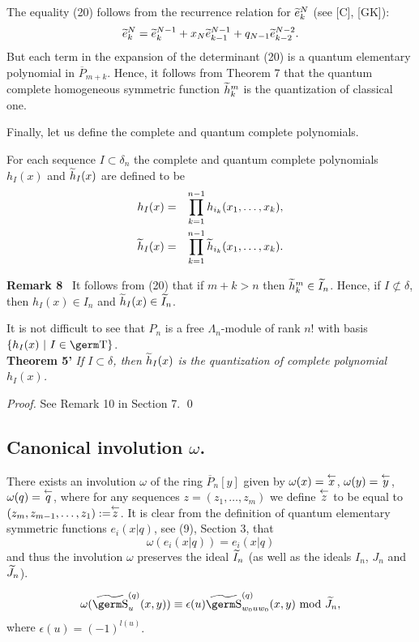 {{The equality (20) follows from the recurrence relation for 
$\widetilde{e}_k^N$ (see [C], [GK]): 
\[ \widetilde{e}_k^N = \widetilde{e}_k^{N-1} + x_N \widetilde{e}_{k-1}^{N-1} 
+ q_{N-1} \widetilde{e}_{k-2}^{N-2}. \] 
But each term in the expansion of the determinant (20) is a quantum elementary 
polynomial in $\overline P_{m+k}$. Hence, it follows from Theorem 7 that 
the quantum complete 
homogeneous symmetric function $\widetilde{h}_k^m$ is the quantization of 
classical one. 

Finally, let us define the complete and quantum complete polynomials.
\begin{de} For each sequence $I\subset\delta_n$ the complete and quantum 
complete polynomials $h_I(x)$ and $\widetilde h_I(x)$ are defined to be
\begin{eqnarray} h_I(x) & = & \prod_{k=1}^{n-1}h_{i_k}(x_1,\ldots ,x_k),\\
\widetilde h_I(x) & = & \prod_{k=1}^{n-1}\widetilde h_{i_k}(x_1,\ldots ,x_k).
\end{eqnarray}
\end{de}
{\bf Remark 8} \ It follows from (20) that if $m+k>n$ then 
$\widetilde h_k^m\in\widetilde I_n$.
Hence, if $I\not\subset\delta$, then $h_I(x)\in I_n$ and $\widetilde h_I(x)\in
\widetilde I_n$.

It is not difficult to see that $P_n$ is a free $\Lambda_n$-module of rank
$n!$ with basis $\{ h_I(x)~|~I\in \t\}$.\smallskip \\
{\bf Theorem 5'} {\it If $I\subset\delta$, then $\widetilde h_I(x)$ is the 
quantization of complete polynomial $h_I(x)$.}

{\it Proof.} See Remark 10 in Section 7. \qed

\subsection{Canonical involution $\omega$.}

There exists an involution $\omega$ of the ring $\overline P_n[y]$ given
by $\omega (x)={\covec x}$, $\omega (y)={\covec y}$, $\omega (q)=
{\covec q}$, where for any sequences $z=(z_1,\ldots , z_m)$ we define 
$\covec z$ to be equal to $(z_m, z_{m-1},\ldots ,z_1):=\covec z$. It 
is clear from the definition of quantum elementary symmetric functions
 $e_i(x|q)$, see (9), Section 3, that
$$\omega (e_i(x|q))=e_i(x|q)
$$
and thus the involution $\omega$ preserves the ideal $\widetilde I_n$ (as well as
the ideals $I_n$, $J_n$ and $\widetilde J_n$).
\begin{pr} 
$$\omega (\wt{\s}_u^{(q)}(x,y))\equiv\epsilon (u)
\wt{\s}_{w_0uw_0}^{(q)}(x,y)~\mod\wt J_n,
$$ 
where $\epsilon (u)=(-1)^{l(u)}.$
\end{pr}

}}
